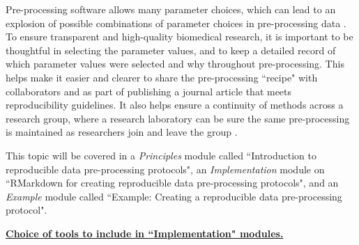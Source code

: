 \documentclass[pdftex,english,11pt,parskip=half]{scrartcl}
\begin{document}
Pre-processing software allows many parameter choices, which can lead to an explosion of possible combinations of parameter choices in pre-processing data \cite{munafo2017manifesto, shade2015computing, pernet2015improving}. To ensure transparent and high-quality biomedical research, it is important to be thoughtful in selecting the parameter values, and to keep a detailed record of which parameter values were selected and why throughout pre-processing. This helps make it easier and clearer to share the pre-processing ``recipe" with collaborators and as part of publishing a journal article that meets reproducibility guidelines. It also helps ensure a continuity of methods across a research group, where a research laboratory can be sure the same pre-processing is maintained as researchers join and leave the group \cite{shade2015computing}.

This topic will be covered in a \textit{Principles} module called ``Introduction to reproducible data pre-processing protocols", an \textit{Implementation} module on ``RMarkdown
for creating reproducible data pre-processing protocols", and an
\textit{Example} module called ``Example: Creating a reproducible data
pre-processing protocol". 

\underline{\textbf{Choice of tools to include in ``Implementation" modules.}}
\end{document}
